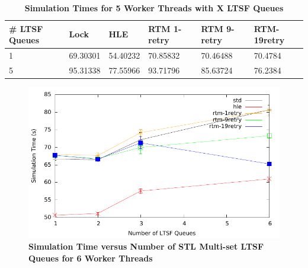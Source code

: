 \documentclass[11pt]{book}
\begin{document}
\begin{table}[H]
    \centering
    \begin{tabular}{l|p{2cm}|p{2cm}|p{2cm}|p{2cm}|p{2cm}}
        \textbf{\# LTSF Queues}&Lock &HLE &RTM 1-retry &RTM 9-retry &RTM-19retry \\
        \hline
        \midrule
            1 &69.30301  &54.40232 &70.85832  &70.46488 &70.4784 \\ 
            5 &95.31338  &77.55966 &93.71796  &85.63724 &76.2384 \\
    \end{tabular}
    \caption{\textbf{Simulation Times for 5 Worker Threads with X LTSF Queues}}
    \label{tab:xThrMig_5threadsXschq}
\end{table}

\begin{figure}[H]
    \centering
    \graphicspath{ {./figures/} }
    \includegraphics[width=\textwidth,height=\textheight,keepaspectratio]{xThrMig-hugeEpidemicSim-timeVSschedQs-multiset-6thread}
    \caption{\textbf{Simulation Time versus Number of STL Multi-set LTSF Queues
    for 6 Worker Threads}}
    \label{fig:xThrMig_timeVSschq_6threads}
\end{figure}
\end{document}

